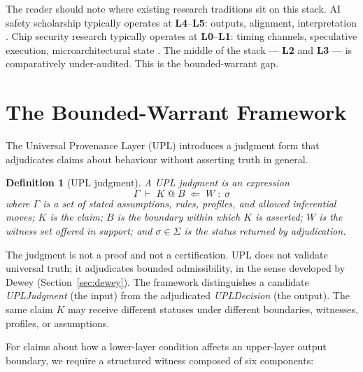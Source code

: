 \documentclass[11pt, a4paper]{article}
\theoremstyle{upldef}
\newtheorem{definition}{Definition}
\newcommand{\layer}[1]{\textbf{L#1}}
\begin{document}
The reader should note where existing research traditions sit on
this stack. AI safety scholarship typically operates at
\layer{4}--\layer{5}: outputs, alignment, interpretation
\citep{hendrycks2021}. Chip security research typically operates
at \layer{0}--\layer{1}: timing channels, speculative execution,
microarchitectural state \citep{kocher2019, lipp2018}. The middle
of the stack --- \layer{2} and \layer{3} --- is comparatively
under-audited. This is the bounded-warrant gap.

\section{The Bounded-Warrant Framework}
\label{sec:framework}

The Universal Provenance Layer (UPL) introduces a judgment form
that adjudicates claims about behaviour without asserting truth in
general.

\begin{definition}[UPL judgment]\label{def:judgment}
A UPL judgment is an expression
\[
\Gamma \;\vdash\; K \;@\; B \;\Leftarrow\; W \;:\; \sigma
\]
where $\Gamma$ is a set of stated assumptions, rules, profiles, and
allowed inferential moves; $K$ is the claim; $B$ is the boundary
within which $K$ is asserted; $W$ is the witness set offered in
support; and $\sigma \in \Sigma$ is the status returned by
adjudication.
\end{definition}

The judgment is not a proof and not a certification. UPL does not
validate universal truth; it adjudicates bounded admissibility, in
the sense developed by Dewey (Section~\ref{sec:dewey}). The
framework distinguishes a candidate \emph{UPLJudgment} (the input)
from the adjudicated \emph{UPLDecision} (the output). The same
claim $K$ may receive different statuses under different boundaries,
witnesses, profiles, or assumptions.

For claims about how a lower-layer condition affects an upper-layer
output boundary, we require a structured witness composed of six
components:
\end{document}
